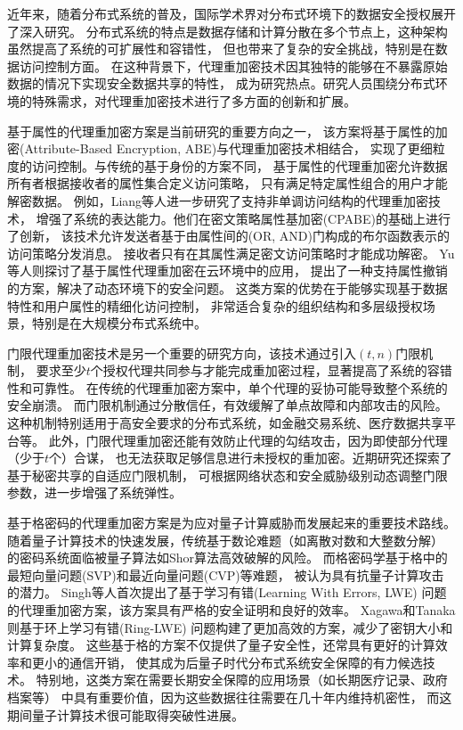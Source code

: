 近年来，随着分布式系统的普及，国际学术界对分布式环境下的数据安全授权展开了深入研究。
分布式系统的特点是数据存储和计算分散在多个节点上，这种架构虽然提高了系统的可扩展性和容错性，
但也带来了复杂的安全挑战，特别是在数据访问控制方面。
在这种背景下，代理重加密技术因其独特的能够在不暴露原始数据的情况下实现安全数据共享的特性，
成为研究热点。研究人员围绕分布式环境的特殊需求，对代理重加密技术进行了多方面的创新和扩展。

基于属性的代理重加密方案是当前研究的重要方向之一，
该方案将基于属性的加密(Attribute-Based Encryption, ABE)与代理重加密技术相结合，
实现了更细粒度的访问控制。与传统的基于身份的方案不同，
基于属性的代理重加密允许数据所有者根据接收者的属性集合定义访问策略，
只有满足特定属性组合的用户才能解密数据。
例如，Liang等人进一步研究了支持非单调访问结构的代理重加密技术，
增强了系统的表达能力。他们在密文策略属性基加密(CPABE)的基础上进行了创新，
该技术允许发送者基于由属性间的(OR, AND)门构成的布尔函数表示的访问策略分发消息。
接收者只有在其属性满足密文访问策略时才能成功解密。
Yu等人则探讨了基于属性代理重加密在云环境中的应用，
提出了一种支持属性撤销的方案，解决了动态环境下的安全问题。
这类方案的优势在于能够实现基于数据特性和用户属性的精细化访问控制，
非常适合复杂的组织结构和多层级授权场景，特别是在大规模分布式系统中。

门限代理重加密技术是另一个重要的研究方向，该技术通过引入$(t, n)$门限机制，
要求至少$t$个授权代理共同参与才能完成重加密过程，显著提高了系统的容错性和可靠性。
在传统的代理重加密方案中，单个代理的妥协可能导致整个系统的安全崩溃。
而门限机制通过分散信任，有效缓解了单点故障和内部攻击的风险。
这种机制特别适用于高安全要求的分布式系统，如金融交易系统、医疗数据共享平台等。
此外，门限代理重加密还能有效防止代理的勾结攻击，因为即使部分代理（少于$t$个）合谋，
也无法获取足够信息进行未授权的重加密。近期研究还探索了基于秘密共享的自适应门限机制，
可根据网络状态和安全威胁级别动态调整门限参数，进一步增强了系统弹性。

基于格密码的代理重加密方案是为应对量子计算威胁而发展起来的重要技术路线。
随着量子计算技术的快速发展，传统基于数论难题（如离散对数和大整数分解）
的密码系统面临被量子算法如Shor算法高效破解的风险。
而格密码学基于格中的最短向量问题(SVP)和最近向量问题(CVP)等难题，
被认为具有抗量子计算攻击的潜力。
Singh等人首次提出了基于学习有错(Learning With Errors, LWE)
问题的代理重加密方案，该方案具有严格的安全证明和良好的效率。
Xagawa和Tanaka则基于环上学习有错(Ring-LWE)
问题构建了更加高效的方案，减少了密钥大小和计算复杂度。
这些基于格的方案不仅提供了量子安全性，还常具有更好的计算效率和更小的通信开销，
使其成为后量子时代分布式系统安全保障的有力候选技术。
特别地，这类方案在需要长期安全保障的应用场景（如长期医疗记录、政府档案等）
中具有重要价值，因为这些数据往往需要在几十年内维持机密性，
而这期间量子计算技术很可能取得突破性进展。


